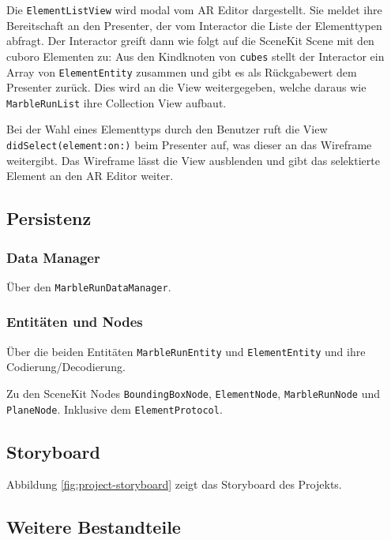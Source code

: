 Die \texttt{ElementListView} wird modal vom AR Editor dargestellt.
Sie meldet ihre Bereitschaft an den Presenter, der vom Interactor die Liste der Elementtypen abfragt.
Der Interactor greift dann wie folgt auf die SceneKit Scene mit den cuboro Elementen zu:
Aus den Kindknoten von \texttt{cubes} stellt der Interactor ein Array von \texttt{ElementEntity} zusammen und gibt es als Rückgabewert dem Presenter zurück.
Dies wird an die View weitergegeben, welche daraus wie \texttt{MarbleRunList} ihre Collection View aufbaut.

Bei der Wahl eines Elementtyps durch den Benutzer ruft die View \texttt{didSelect(element:on:)} beim Presenter auf, was dieser an das Wireframe weitergibt.
Das Wireframe lässt die View ausblenden und gibt das selektierte Element an den AR Editor weiter.

\subsection{Persistenz}

\subsubsection{Data Manager} \label{subsub:umsetzung-datamanager}

Über den \texttt{MarbleRunDataManager}.

\subsubsection{Entitäten und Nodes}

Über die beiden Entitäten \texttt{MarbleRunEntity} und \texttt{ElementEntity} und ihre Codierung/Decodierung.

Zu den SceneKit Nodes \texttt{BoundingBoxNode}, \texttt{ElementNode}, \texttt{MarbleRunNode} und \texttt{PlaneNode}. Inklusive dem \texttt{ElementProtocol}.


\subsection{Storyboard}

Abbildung \ref{fig:project-storyboard} zeigt das Storyboard des Projekts.



\subsection{Weitere Bestandteile}

